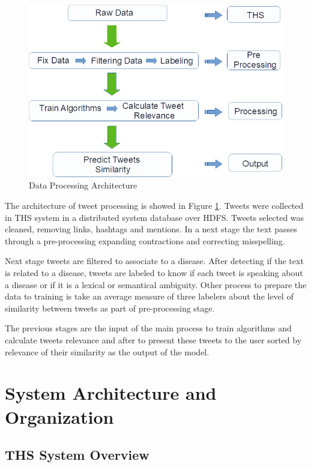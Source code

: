 \documentclass[12pt]{report}
\begin{document}
\begin{figure}[H]	
	\centering
	\includegraphics[width=150mm, scale = 1]{images/5_data_processing.png}	
	\caption{Data Processing Architecture}	
	\label{figure:data_processing}
\end{figure}

The architecture of tweet processing is showed in Figure \ref{figure:data_processing}. Tweets were collected in \ac{THS} system in a distributed system database over \ac{HDFS}. Tweets selected was cleaned, removing links, hashtags and mentions. In a next stage the text passes through a pre-processing expanding contractions and correcting misspelling.

Next stage tweets are filtered to associate to a disease. After detecting if the text is related to a disease, tweets are labeled to know if each tweet is speaking about a disease or if it is a lexical or semantical ambiguity. Other process to prepare the data to training is take an average measure of three labelers about the level of similarity between tweets as part of pre-processing stage.

The previous stages are the input of the main process to train algorithms and calculate tweets relevance and after to present these tweets to the user sorted by relevance of their similarity as the output of the model.

\chapter{System Architecture and Organization} \label{chapter 4}
\section{THS System Overview} \label{ths_system}
\end{document}
